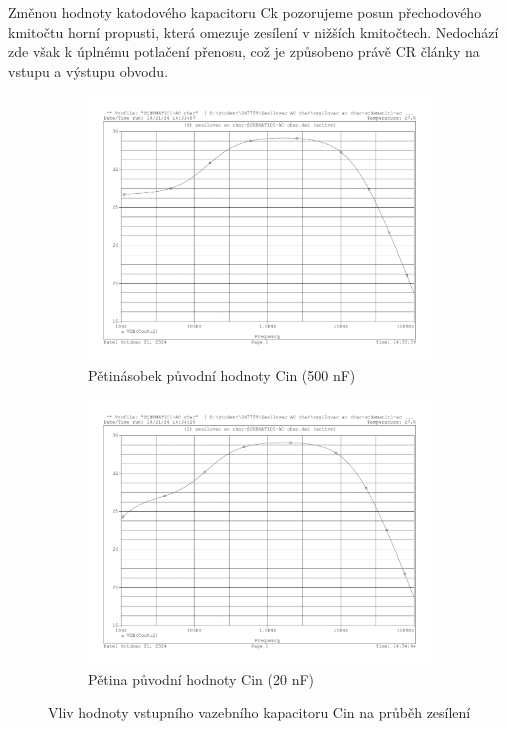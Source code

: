 \documentclass[a4paper, czech]{article}
\begin{document}
Změnou hodnoty katodového kapacitoru Ck pozorujeme posun přechodového kmitočtu horní propusti, která omezuje zesílení v nižších kmitočtech.
Nedochází zde však k úplnému potlačení přenosu, což je způsobeno právě CR články na vstupu a výstupu obvodu.

\begin{figure}[H]
    \centering
    \begin{subfigure}{0.49\textwidth}
        \centering
        \includegraphics[width=\textwidth]{charakteristiky/uloha3_Cin_5krat_vetsi_500n.pdf}
        \caption{Pětinásobek původní hodnoty Cin (500 nF)}
    \end{subfigure}
    \hfill
    \begin{subfigure}{0.49\textwidth}
        \centering
        \includegraphics[width=\textwidth]{charakteristiky/uloha3_Cin_5krat_mensi_20n.pdf}
        \caption{Pětina původní hodnoty Cin (20 nF)}
    \end{subfigure}
    \caption{Vliv hodnoty vstupního vazebního kapacitoru Cin na průběh zesílení}
\end{figure}
\end{document}
